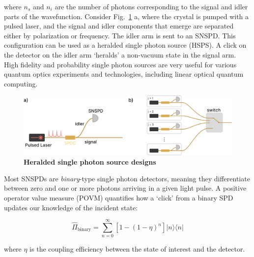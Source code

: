 \documentclass[11pt]{caltech_thesis} %
\begin{document}
where $n_s$ and $n_i$ are the number of photons corresponding to the signal and idler parts of the wavefunction. Consider Fig.~\ref{fig:hsps} a, where the crystal is pumped with a pulsed laser, and the signal and idler components that emerge are separated either by polarization or frequency. The idler arm is sent to an SNSPD. This configuration can be used as a heralded single photon source (HSPS). A click on the detector on the idler arm `heralds' a non-vacuum state in the signal arm. High fidelity and probability single photon sources are very useful for various quantum optics experiments and technologies, including linear optical quantum computing.

\hypertarget{fig:hsps}{%
\begin{figure}
\centering
\includegraphics{./chapter_07/figs/hsps_light.pdf}
\caption[{Heralded single photon source designs}]{\textbf{Heralded single photon source designs}}
\label{fig:hsps}
\end{figure}
}

Most SNSPDs are \emph{binary}-type single photon detectors, meaning they differentiate between zero and one or more photons arriving in a given light pulse. A positive operator value measure (POVM) quantifies how a `click' from a binary SPD updates our knowledge of the incident state:

$$\hat{\Pi}_{\text {binary}} = \sum_{n=0}^{\infty}\left[1-(1-\eta)^{n}\right]|n\rangle\langle n|$$

where $\eta$ is the coupling efficiency between the state of interest and the detector.
\end{document}
